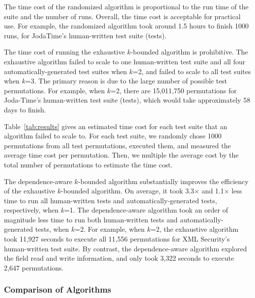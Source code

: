 The time cost of the randomized algorithm 
is proportional to the run time of the suite and the number of runs.
Overall, the time cost is acceptable for practical use.
For example, the randomized algorithm took around 1.5 hours
to finish 1000 runs,  for JodaTime's human-written test
suite (\jodatimetests tests).
 
The time cost of running the exhaustive $k$-bounded algorithm
is prohibitive. The exhaustive algorithm failed to
scale to one human-written test suite and all four automatically-generated
test suites when $k$=2, and failed to scale to all test suites
when $k$=3. The primary reason is due to the large
number of possible test permutations. 
For example, when $k$=2, there are 15,011,750 permutations
for Joda-Time's human-written test suite (\jodatimetests tests),
which would take approximately 58 days to finish.

Table~\ref{tab:results} gives an estimated time cost for each
test suite that an algorithm failed to scale to. For each test suite,
we randomly chose 1000 permutations from all
test permutations, executed them, and measured the average time cost
per permutation. Then, we multiple
the average cost by the total number of permutations to estimate
the time cost.

The dependence-aware $k$-bounded algorithm substantially improves
the efficiency of the exhaustive $k$-bounded algorithm. On average,
it took 3.3$\times$ and 1.1$\times$ less time to run all
human-written tests and automatically-generated tests, respectively, when $k$=1.
The dependence-aware algorithm took an order of magnitude
less time to run both human-written tests and automatically-generated tests,
when $k$=2.
For example, when $k$=2, the exhaustive algorithm took 11,927 seconds
to execute all 11,556 permutations for XML Security's human-written test suite.
By contrast, the dependence-aware algorithm
explored the field read and write information, and
only took 3,322 seconds to execute 2,647 permutations.





\subsubsection{Comparison of Algorithms}
\label{sec:algcomparison}

